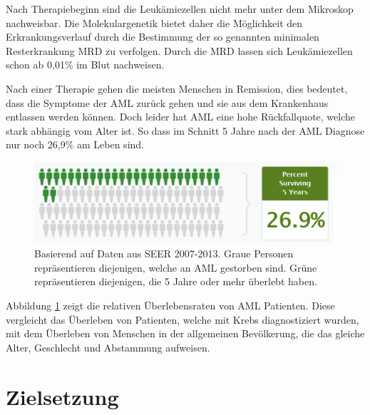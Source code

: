 Nach Therapiebeginn sind die Leukämiezellen nicht mehr unter dem Mikroskop nachweisbar. Die Molekulargenetik bietet daher die Möglichkeit den Erkrankungsverlauf durch die Bestimmung der so genannten minimalen Resterkrankung \ac{MRD} zu verfolgen. Durch die \ac{MRD} lassen sich Leukämiezellen schon ab 0,01\% im Blut nachweisen.

Nach einer Therapie gehen die meisten Menschen in Remission, dies bedeutet, dass die Symptome der \ac{AML} zurück gehen und sie aus dem Krankenhaus entlassen werden können. Doch leider hat \ac{AML} eine hohe Rückfallquote, welche stark abhängig vom Alter ist. So dass im Schnitt 5 Jahre nach der \ac{AML} Diagnose nur noch 26,9\% am Leben sind.

\begin{figure}
    \centering
    \includegraphics[width=.95\textwidth]{images/SEER_survival_rate_AML.png}
    \caption{Basierend auf Daten aus SEER 2007-2013. Graue Personen repräsentieren diejenigen, welche an \ac{AML} gestorben sind. Grüne repräsentieren diejenigen, die 5 Jahre oder mehr überlebt haben\protect\footnotemark{}.}
    \label{fig:seer_aml_rate}
\end{figure}

Abbildung \ref{fig:seer_aml_rate} zeigt die relativen Überlebensraten von \ac{AML} Patienten. Diese vergleicht das Überleben von Patienten, welche mit Krebs diagnostiziert wurden, mit dem Überleben von Menschen in der allgemeinen Bevölkerung, die das gleiche Alter, Geschlecht und Abstammung aufweisen. 


\section{Zielsetzung}

